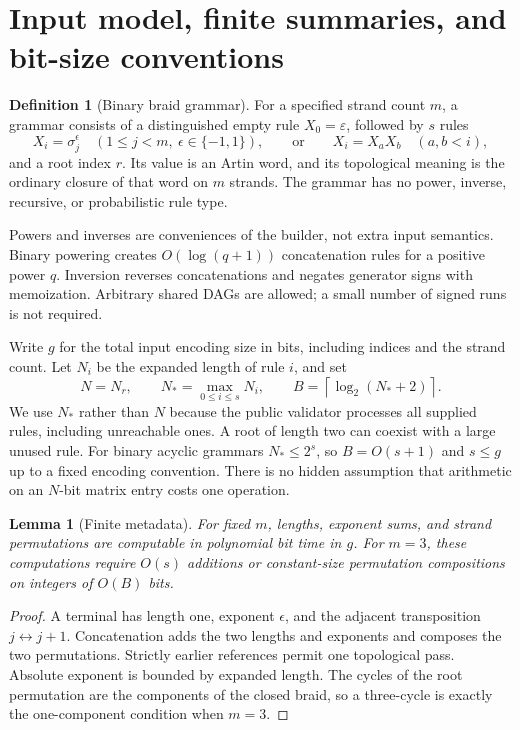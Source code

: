 \documentclass[11pt,letterpaper]{article}
\newtheorem{lemma}[theorem]{Lemma}
\theoremstyle{definition}\newtheorem{definition}[theorem]{Definition}
\theoremstyle{remark}\newtheorem{remark}[theorem]{Remark}
\begin{document}
\section{Input model, finite summaries, and bit-size conventions}
\begin{definition}[Binary braid grammar]
For a specified strand count $m$, a grammar consists of a distinguished empty rule $X_0=\varepsilon$, followed by $s$ rules
\[
 X_i=\sigma_j^{\epsilon}\quad(1\le j<m,\ \epsilon\in\{-1,1\}),
 \qquad\text{or}\qquad X_i=X_aX_b\quad(a,b<i),
\]
and a root index $r$. Its value is an Artin word, and its topological meaning is the ordinary closure of that word on $m$ strands. The grammar has no power, inverse, recursive, or probabilistic rule type.
\end{definition}
Powers and inverses are conveniences of the builder, not extra input semantics. Binary powering creates $O(\log(q+1))$ concatenation rules for a positive power $q$. Inversion reverses concatenations and negates generator signs with memoization. Arbitrary shared DAGs are allowed; a small number of signed runs is not required.

Write $g$ for the total input encoding size in bits, including indices and the strand count. Let $N_i$ be the expanded length of rule $i$, and set
\[
 N=N_r,\qquad N_* = \max_{0\le i\le s}N_i,
 \qquad B=\left\lceil\log_2(N_*+2)\right\rceil.
\]
We use $N_*$ rather than $N$ because the public validator processes all supplied rules, including unreachable ones. A root of length two can coexist with a large unused rule. For binary acyclic grammars $N_*\le 2^s$, so $B=O(s+1)$ and $s\le g$ up to a fixed encoding convention. There is no hidden assumption that arithmetic on an $N$-bit matrix entry costs one operation.

\begin{lemma}[Finite metadata]\label{lem:metadata}
For fixed $m$, lengths, exponent sums, and strand permutations are computable in polynomial bit time in $g$. For $m=3$, these computations require $O(s)$ additions or constant-size permutation compositions on integers of $O(B)$ bits.
\end{lemma}
\begin{proof}
A terminal has length one, exponent $\epsilon$, and the adjacent transposition $j\leftrightarrow j+1$. Concatenation adds the two lengths and exponents and composes the two permutations. Strictly earlier references permit one topological pass. Absolute exponent is bounded by expanded length. The cycles of the root permutation are the components of the closed braid, so a three-cycle is exactly the one-component condition when $m=3$.
\end{proof}
\end{document}
